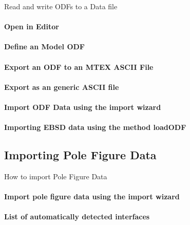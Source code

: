\documentclass{article}
\begin{document}
		
                     \begin{par}
Read and write ODFs to a Data file
\end{par} \vspace{1em}

                  
			\paragraph{Open in Editor}
		
			\paragraph{Define an Model ODF}
		
			\paragraph{Export an ODF to an MTEX ASCII File}
		
			\paragraph{Export as an generic ASCII file}
		
			\paragraph{Import ODF Data using the import wizard}
		
			\paragraph{Importing EBSD data using the method loadODF}
		
		\subsection{Importing Pole Figure Data}

		
                     \begin{par}
How to import Pole Figure Data
\end{par} \vspace{1em}

                  
			\paragraph{Import pole figure data using the import wizard}
		
			\paragraph{List of automatically detected interfaces}
		
\end{document}
